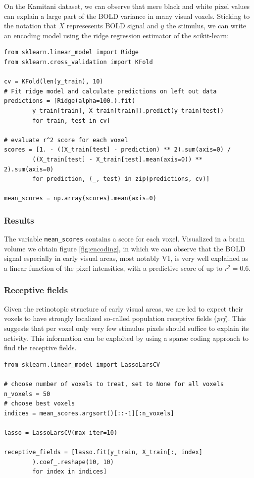 \documentclass{frontiersSCNS} %
\newcounter{x}
\newcounter{y}
\newcounter{z}
\begin{document}
On the Kamitani dataset, we can observe that mere black and white pixel values can explain a large part of the BOLD variance in many visual voxels. Sticking to the notation that \(X\) represesents BOLD signal and \(y\) the stimulus, we can write an encoding model using the ridge regression estimator of the scikit-learn:

\begin{lstlisting}
from sklearn.linear_model import Ridge
from sklearn.cross_validation import KFold

cv = KFold(len(y_train), 10)
# Fit ridge model and calculate predictions on left out data
predictions = [Ridge(alpha=100.).fit(
        y_train[train], X_train[train]).predict(y_train[test])
        for train, test in cv]

# evaluate r^2 score for each voxel
scores = [1. - ((X_train[test] - prediction) ** 2).sum(axis=0) /
        ((X_train[test] - X_train[test].mean(axis=0)) ** 2).sum(axis=0)
        for prediction, (_, test) in zip(predictions, cv)]

mean_scores = np.array(scores).mean(axis=0)

\end{lstlisting}

\subsubsection{Results}
The variable \texttt{mean\_scores} contains a score for each voxel. Visualized in a brain volume we obtain figure \ref{fig:encoding}, in which we can observe that the BOLD signal especially in early visual areas, most notably V1, is very well explained as a linear function of the pixel intensities, with a predictive score of up to \(r^2 = 0.6\).

\subsubsection{Receptive fields}
Given the retinotopic structure of early visual areas, we are led to expect their voxels to have strongly localized so-called population receptive fields (\textit{prf}). This suggests that per voxel only very few stimulus pixels should suffice to explain its activity. This information can be exploited by using a sparse coding approach to find the receptive fields.

\begin{lstlisting}
from sklearn.linear_model import LassoLarsCV

# choose number of voxels to treat, set to None for all voxels
n_voxels = 50
# choose best voxels
indices = mean_scores.argsort()[::-1][:n_voxels]

lasso = LassoLarsCV(max_iter=10)

receptive_fields = [lasso.fit(y_train, X_train[:, index]
        ).coef_.reshape(10, 10)
        for index in indices]

\end{lstlisting}
\end{document}
